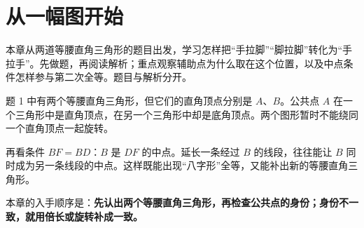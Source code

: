 \setcounter{section}{-1}
\section{从一幅图开始}
本章从两道等腰直角三角形的题目出发，学习怎样把“手拉脚”“脚拉脚”转化为“手拉手”。先做题，再阅读解析；重点观察辅助点为什么取在这个位置，以及中点条件怎样参与第二次全等。题目与解析分开。



题 1 中有两个等腰直角三角形，但它们的直角顶点分别是 \(A\)、\(B\)。公共点 \(A\) 在一个三角形中是直角顶点，在另一个三角形中却是底角顶点。两个图形暂时不能绕同一个直角顶点一起旋转。

再看条件 \(BF=BD\)：\(B\) 是 \(DF\) 的中点。延长一条经过 \(B\) 的线段，往往能让 \(B\) 同时成为另一条线段的中点。这样既能出现“八字形”全等，又能补出新的等腰直角三角形。

本章的入手顺序是：\textbf{先认出两个等腰直角三角形，再检查公共点的身份；身份不一致，就用倍长或旋转补成一致。}
